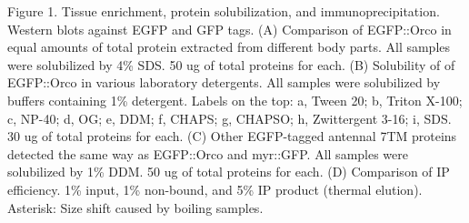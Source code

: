 Figure 1. Tissue enrichment, protein solubilization, and immunoprecipitation. Western blots against EGFP and GFP tags. (A) Comparison of EGFP::Orco in equal amounts of total protein extracted from different body parts. All samples were solubilized by 4\% SDS. 50 ug of total proteins for each. (B) Solubility of of EGFP::Orco in various laboratory detergents. All samples were solubilized by buffers containing 1\% detergent. Labels on the top: a, Tween 20; b, Triton X-100; c, NP-40; d, OG; e, DDM; f, CHAPS; g, CHAPSO; h, Zwittergent 3-16; i, SDS. 30 ug of total proteins for each. (C) Other EGFP-tagged antennal 7TM proteins detected the same way as EGFP::Orco and myr::GFP. All samples were solubilized by 1\% DDM. 50 ug of total proteins for each. (D) Comparison of IP efficiency. 1\% input, 1\% non-bound, and 5\% IP product (thermal elution). Asterisk: Size shift caused by boiling samples.